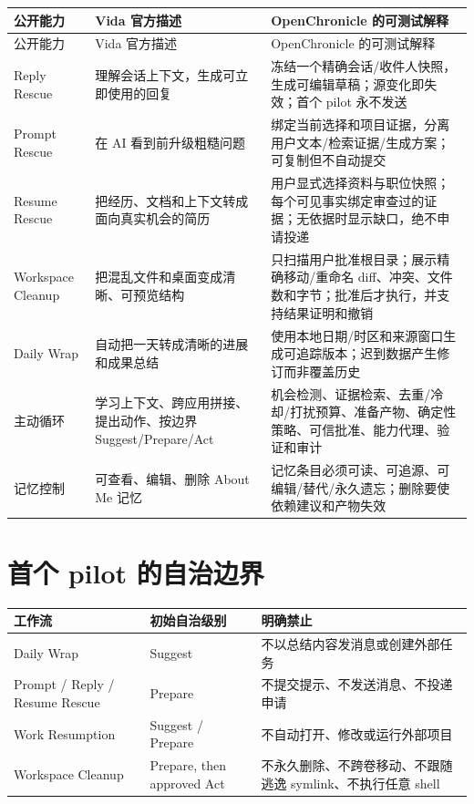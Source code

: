 \documentclass[UTF8,fontset=none,zihao=-4,openany]{ctexrep}
\begin{document}
\begin{longtable}{p{31mm}p{54mm}p{74mm}}
\toprule
公开能力 & Vida 官方描述 & OpenChronicle 的可测试解释 \\
\midrule
\endfirsthead
\toprule
公开能力 & Vida 官方描述 & OpenChronicle 的可测试解释 \\
\midrule
\endhead
Reply Rescue & 理解会话上下文，生成可立即使用的回复 & 冻结一个精确会话/收件人快照，生成可编辑草稿；源变化即失效；首个 pilot 永不发送 \\
Prompt Rescue & 在 AI 看到前升级粗糙问题 & 绑定当前选择和项目证据，分离用户文本/检索证据/生成方案；可复制但不自动提交 \\
Resume Rescue & 把经历、文档和上下文转成面向真实机会的简历 & 用户显式选择资料与职位快照；每个可见事实绑定审查过的证据；无依据时显示缺口，绝不申请投递 \\
Workspace Cleanup & 把混乱文件和桌面变成清晰、可预览结构 & 只扫描用户批准根目录；展示精确移动/重命名 diff、冲突、文件数和字节；批准后才执行，并支持结果证明和撤销 \\
Daily Wrap & 自动把一天转成清晰的进展和成果总结 & 使用本地日期/时区和来源窗口生成可追踪版本；迟到数据产生修订而非覆盖历史 \\
主动循环 & 学习上下文、跨应用拼接、提出动作、按边界 Suggest/Prepare/Act & 机会检测、证据检索、去重/冷却/打扰预算、准备产物、确定性策略、可信批准、能力代理、验证和审计 \\
记忆控制 & 可查看、编辑、删除 About Me 记忆 & 记忆条目必须可读、可追源、可编辑/替代/永久遗忘；删除要使依赖建议和产物失效 \\
\bottomrule
\end{longtable}

\section{首个 pilot 的自治边界}

\begin{center}
\begin{tabularx}{\textwidth}{p{36mm}p{32mm}Y}
\toprule
工作流 & 初始自治级别 & 明确禁止 \\
\midrule
Daily Wrap & Suggest & 不以总结内容发消息或创建外部任务 \\
Prompt / Reply / Resume Rescue & Prepare & 不提交提示、不发送消息、不投递申请 \\
Work Resumption & Suggest / Prepare & 不自动打开、修改或运行外部项目 \\
Workspace Cleanup & Prepare, then approved Act & 不永久删除、不跨卷移动、不跟随逃逸 symlink、不执行任意 shell \\
\bottomrule
\end{tabularx}
\end{center}
\end{document}
